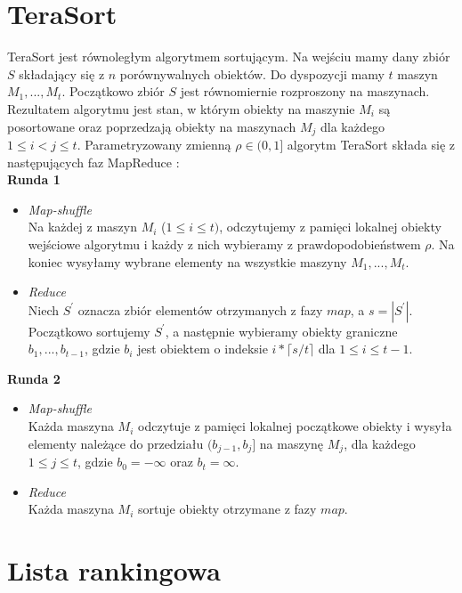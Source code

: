 \documentclass{pracamgr}
\begin{document}
\section{TeraSort}

TeraSort jest równoległym algorytmem sortującym. Na wejściu mamy dany zbiór \(S\) składający się z \(n\) porównywalnych obiektów. Do dyspozycji mamy \(t\) maszyn \(M_1, ..., M_t\). Początkowo zbiór \(S\) jest równomiernie rozproszony na maszynach. Rezultatem algorytmu jest stan, w którym obiekty na maszynie \(M_i\) są posortowane oraz poprzedzają obiekty na maszynach \(M_j\) dla każdego \(1 \leq i < j \leq t\). Parametryzowany zmienną \(\rho \in (0, 1]\) algorytm TeraSort składa się z następujących faz MapReduce \cite{tao2013minimal}: \\

\textbf{Runda 1}
\begin{itemize}
    \item \textit{Map-shuffle} \\
    Na każdej z maszyn \(M_i\) (\(1 \leq i \leq t)\), odczytujemy z pamięci lokalnej obiekty wejściowe algorytmu i każdy z nich wybieramy z prawdopodobieństwem \(\rho\). Na koniec wysyłamy wybrane elementy na wszystkie maszyny \(M_1, ..., M_t\).
    \item \textit{Reduce} \\
    Niech \(S^{\prime}\) oznacza zbiór elementów otrzymanych z fazy \(map\), a \(s = |S^{\prime}|\). Początkowo sortujemy \(S^{\prime}\), a następnie wybieramy obiekty graniczne \(b_1, ..., b_{t-1}\), gdzie \(b_i\) jest obiektem o indeksie \(i*\lceil{s / t}\rceil\) dla \(1 \leq i \leq t-1\).
\end{itemize}

\textbf{Runda 2}
\begin{itemize}
    \item \textit{Map-shuffle} \\
    Każda maszyna \(M_i\) odczytuje z pamięci lokalnej początkowe obiekty i wysyła elementy należące do przedziału \((b_{j-1}, b_j]\) na maszynę \(M_j\), dla każdego \(1 \leq j \leq t\), gdzie \(b_0 = -\infty\) oraz \(b_t = \infty\).
    \item \textit{Reduce} \\
    Każda maszyna \(M_i\) sortuje obiekty otrzymane z fazy \(map\).
\end{itemize}


\section{Lista rankingowa}
\end{document}
